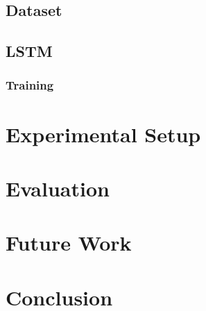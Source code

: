 \subsection{Dataset}
\subsection{LSTM}
\subsubsection{Training}
\section{Experimental Setup}
\section{Evaluation}
\section{Future Work}
\section{Conclusion}


